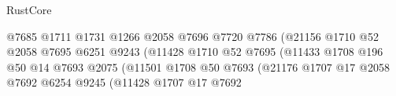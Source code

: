 \begin{lexlean}{RustCore}
\begin{coremodule}
                                                      @7685
                                                      @1711
                                                      @1731
                                                      @1266
                                                      @2058
                                                      @7696
                                                      @7720
                                                      @7786
                                                      (@21156
                                                        @1710
                                                        @52
                                                        @2058
                                                        @7695
                                                        @6251
                                                        @9243
                                                        (@11428
                                                          @1710
                                                          @52
                                                          @7695
                                                          (@11433
                                                            @1708
                                                            @196
                                                            @50
                                                            @14
                                                            @7693
                                                            @2075
                                                            (@11501
                                                              @1708
                                                              @50
                                                              @7693
                                                              (@21176
                                                                @1707
                                                                @17
                                                                @2058
                                                                @7692
                                                                @6254
                                                                @9245
                                                                (@11428
                                                                  @1707
                                                                  @17
                                                                  @7692

\end{coremodule}
\end{lexlean}
